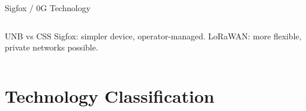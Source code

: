 \documentclass[aspectratio=169,11pt]{beamer}
\begin{document}
\begin{frame}{Sigfox / 0G Technology}
\begin{columns}
        \vspace{0.2cm}
        \begin{alertblock}{UNB vs CSS}
            Sigfox: simpler device, operator-managed.
            LoRaWAN: more flexible, private networks possible.
        \end{alertblock}
    \end{columns}
\end{frame}

\section{Technology Classification}
\end{document}
